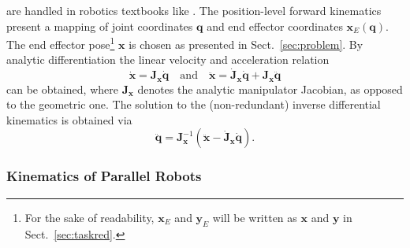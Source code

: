 \documentclass[runningheads]{llncs}
\newcommand{\bm}[1]{\boldsymbol{#1}}
\newcommand{\rotmat}[2]{{{ }^{#1}\boldsymbol{R}}_{#2}}
\newcommand{\transp}[0]{{\mathrm{T}}}
\begin{document}
are handled in robotics textbooks like \cite{SciaviccoSic2000}.
The position-level forward kinematics present a mapping of joint coordinates $\bm{q}$ and end effector coordinates $\bm{x}_E(\bm{q})$.
The end effector pose\footnote{For the sake of readability, $\bm{x}_E$ and $\bm{y}_E$ will be written as $\bm{x}$ and $\bm{y}$ in Sect.~\ref{sec:taskred}.} $\bm{x}$ is chosen as presented in Sect.~\ref{sec:problem}.
By analytic differentiation the linear velocity and acceleration relation
%
\begin{equation}
\dot{\bm{x}}=\bm{J}_{\bm{x}} \dot{\bm{q}}\quad\mathrm{and}\quad \ddot{\bm{x}}=\dot{\bm{J}}_{\bm{x}} \dot{\bm{q}} + \bm{J}_{\bm{x}} \ddot{\bm{q}}
\label{equ:ser_diff_kin}
\end{equation}
can be obtained, where $\bm{J}_{\bm{x}}$ denotes the analytic manipulator Jacobian, as opposed to the geometric one.
%
The solution to the (non-redundant) inverse differential kinematics is obtained via 
\begin{equation}
\ddot{\bm{q}}
=
\bm{J}_{\bm{x}}^{-1}
(\ddot{\bm{x}}
-
\dot{\bm{J}}_{\bm{x}} \dot{\bm{q}}).
\label{equ:ser_invdiff_kin_nonred}
\end{equation}

\subsubsection{Kinematics of Parallel Robots}
\end{document}
